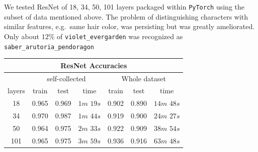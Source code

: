 \documentclass[11.5pt]{article}
\begin{document}
\begin{enumerate}
\begin{itemize}
            \vspace{3mm}

            \begin{minipage}{0.35\textwidth}
                We tested ResNet of 18, 34, 50, 101 layers packaged within \texttt{PyTorch}\cite{pytorch} using the subset of data mentioned above.
                The problem of distinguishing characters with similar features, e.g.\ same hair color, was persisting but was greatly ameliorated.
                Only about $12\%$ of \texttt{violet\_evergarden} was recognized as \texttt{saber\_arutoria\_pendoragon}
            \end{minipage}
            \begin{minipage}{0.45\textwidth}
                \begin{tabular}{|c|c|c|c|c|c|c|}
                    \multicolumn{7}{c}{
                        \textbf{ResNet Accuracies}
                    }\\
                    \hline
                    & \multicolumn{3}{|c|}{self-collected} & \multicolumn{3}{|c|}{Whole dataset} \\ \hline
                    layers & train & test & time & train & test & time \\ \hline
                    18 & 0.965 & 0.969 & $1m$ $19s$ & 0.902 & 0.890 & $14m$ $48s$ \\ \hline
                    34 & 0.970 & 0.987 & $1m$ $44s$ & 0.919 & 0.900 & $24m$ $27s$ \\ \hline
                    50 & 0.964 & 0.975 & $2m$ $33s$ & 0.922 & 0.909 & $38m$ $54s$ \\ \hline
                    101 & 0.965 & 0.975 & $3m$ $59s$ & 0.936 & 0.916 & $63m$ $48s$ \\ \hline
                \end{tabular}
            \end{minipage}
        \end{itemize}
    \end{enumerate}
\end{document}
